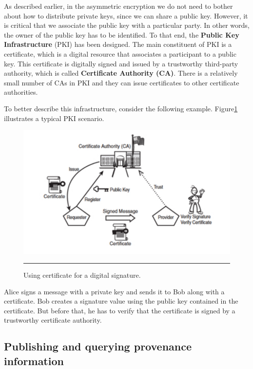 As described earlier, in the asymmetric encryption we do not need to bother about how to distribute private keys, since we can share a public key. However, it is critical that we associate the public key with a particular party. In other words, the owner of the public key has to be identified. To that end, the \textbf{Public Key Infrastructure} (PKI)\cite{pki} has been designed. The main constituent of PKI is a certificate, which is a digital resource that associates a participant to a public key. This certificate is digitally signed and issued by a trustworthy third-party authority, which is called \textbf{Certificate Authority (CA)}. There is a relatively small number of CAs in PKI and they can issue certificates to other certificate authorities.

To better describe this infrastructure, consider the following example. Figure\ref{fig:pki} illustrates a typical PKI scenario.

\begin{figure}[htbp]
	\centering
		\includegraphics{./Figures/figure15.pdf}
		\rule{35em}{0.5pt}
	\caption[Public Key Infrastructure]{Using certificate for a digital signature\cite{Graham:2001:BWS:559927}.}
	\label{fig:pki}
\end{figure}

Alice signs a message with a private key and sends it to Bob along with a certificate.  Bob creates a signature value using the public key contained in the certificate. But before that, he has to verify that the certificate is signed by a trustworthy certificate authority.

\subsection{Publishing and querying provenance information}

